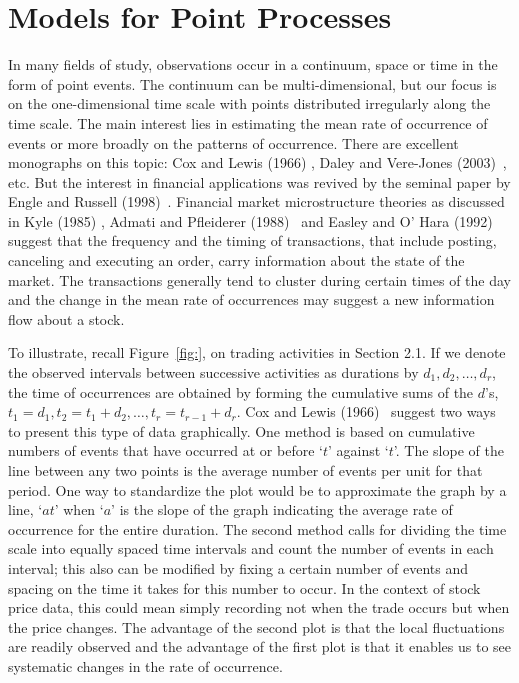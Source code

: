 \section{Models for Point Processes}


In many fields of study, observations occur in a continuum, space or time in the form of point events. The continuum can be multi-dimensional, but our focus is on the one-dimensional time scale with points distributed irregularly along the time scale. The main interest lies in estimating the mean rate of occurrence of events or more broadly on the patterns of occurrence. There are excellent monographs on this topic: Cox and Lewis (1966) \cite{cox1966}, Daley and Vere-Jones (2003)~\cite{daley2003}, etc. But the interest in financial applications was revived by the seminal paper by Engle and Russell (1998)~\cite{engle1998}. Financial market microstructure theories as discussed in Kyle (1985) \cite{kyle1985}, Admati and Pfleiderer (1988)~\cite{admati1988theory} and Easley and O' Hara (1992)~\cite{easley1992} suggest that the frequency and the timing of transactions, that include posting, canceling and executing an order, carry information about the state of the market. The transactions generally tend to cluster during certain times of the day and the change in the mean rate of occurrences may suggest a new information flow about a stock.


To illustrate, recall Figure~\ref{fig:}, on trading activities in Section 2.1. If we denote the observed intervals between successive activities as durations by $d_1, d_2,\ldots,d_r$, the time of occurrences are obtained by forming the cumulative sums of the $d$'s, $t_1=d_1, t_2=t_1+d_2, \ldots, t_r=t_{r-1}+d_r$. Cox and Lewis (1966)~\cite{cox1966} suggest two ways to present this type of data graphically. One method is based on cumulative numbers of events that have occurred at or before `$t$' against `$t$'. The slope of the line between any two points is the average number of events per unit for that period. One way to standardize the plot would be to approximate the graph by a line, `$at$' when `$a$' is the slope of the graph indicating the average rate of occurrence for the entire duration. The second method calls for dividing the time scale into equally spaced time intervals and count the number of events in each interval; this also can be modified by fixing a certain number of events and spacing on the time it takes for this number to occur. In the context of stock price data, this could mean simply recording not when the trade occurs but when the price changes. The advantage of the second plot is that the local fluctuations are readily observed and the advantage of the first plot is that it enables us to see systematic changes in the rate of occurrence.
 
